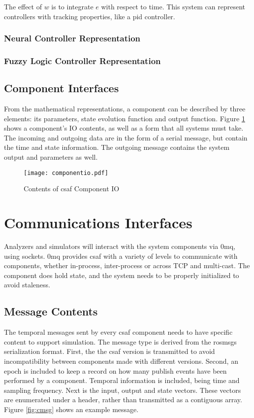 The effect of $w$ is to integrate $e$ with respect to time. This system can represent controllers with tracking
properties, like a \acrshort{pid} controller.

\subsubsection{Neural Controller Representation}

\subsubsection{Fuzzy Logic Controller Representation}

\subsection{Component Interfaces}

From the mathematical representations, a component can be described by three elements: its parameters, 
state evolution function and output function. Figure \ref{fig:cio} shows a component's IO contents, as well as 
a form that all systems must take. The incoming and outgoing data are in the form of a serial message, but 
contain the time and state information. The outgoing message contains the system output and parameters as 
well.

\begin{figure}
\centering
\texttt{[image: componentio.pdf]}
\caption{Contents of \acrshort{csaf}  Component IO}
\label{fig:cio}
\end{figure}

\section{Communications Interfaces}

Analyzers and simulators will interact with the system components via \acrshort{0mq}, using sockets. \acrshort{0mq} 
provides \acrshort{csaf}  with a variety of levels to communicate with components, whether in-process, 
inter-process or across TCP and multi-cast. The component does hold state, and the system needs to be 
properly initialized to avoid staleness.

\subsection{Message Contents}

The temporal messages sent by every \acrshort{csaf}  component needs to have specific content to support 
simulation. The message type is derived from the \acrshort{ros}msgs serialization format. First, the the 
\acrshort{csaf}  version is transmitted to avoid incompatibility between components made with different 
versions. Second, an epoch is included to keep a record on how many publish events have been performed 
by a component. Temporal information is included, being time and sampling frequency. Next is the input, 
output and state vectors. These vectors are enumerated under a header, rather than transmitted as a 
contiguous array. Figure \ref{fig:cmsg} shows an example message. \\

